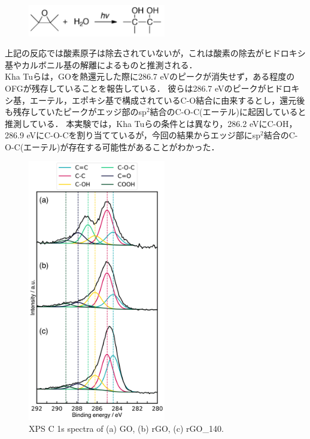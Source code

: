 \documentclass[platex,dvipdfmx]{jlreq}			%
\begin{document}
\begin{figure}
    \centering
    \includegraphics[width=60mm]{figures/fig_equation2.png}
    \label{fig:equation2}
\end{figure}

上記の反応では酸素原子は除去されていないが，これは酸素の除去がヒドロキシ基やカルボニル基の解離によるものと推測される．\\
\indent
Kha Tuらは，GOを熱還元した際に286.7 eVのピークが消失せず，ある程度のOFGが残存していることを報告している．
彼らは286.7 eVのピークがヒドロキシ基，エーテル，エポキシ基で構成されているC-O結合に由来するとし，還元後も残存していたピークがエッジ部のsp$^2$結合のC-O-C(エーテル)に起因していると推測している．
本実験では，Kha Tuらの条件とは異なり，286.2 eVにC-OH，286.9 eVにC-O-Cを割り当てているが，今回の結果からエッジ部にsp$^2$結合のC-O-C(エーテル)が存在する可能性があることがわかった．

\begin{figure}[H]
    \centering
    \includegraphics[width=60mm]{figures/figure3.png}
    \caption{XPS C 1s spectra of (a) GO, (b) rGO, (c) rGO\_140.}
    \label{fig:XPS}
\end{figure}
\end{document}
